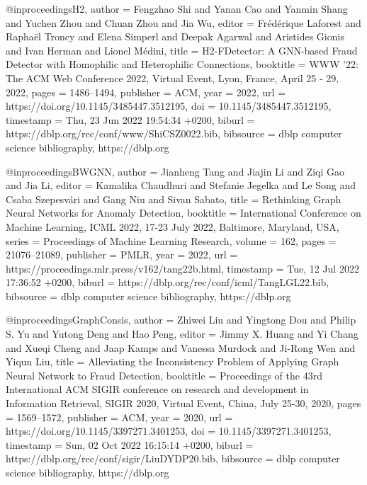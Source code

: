 @inproceedings{H2,
  author    = {Fengzhao Shi and
               Yanan Cao and
               Yanmin Shang and
               Yuchen Zhou and
               Chuan Zhou and
               Jia Wu},
  editor    = {Fr{\'{e}}d{\'{e}}rique Laforest and
               Rapha{\"{e}}l Troncy and
               Elena Simperl and
               Deepak Agarwal and
               Aristides Gionis and
               Ivan Herman and
               Lionel M{\'{e}}dini},
  title     = {H2-FDetector: {A} GNN-based Fraud Detector with Homophilic and Heterophilic
               Connections},
  booktitle = {{WWW} '22: The {ACM} Web Conference 2022, Virtual Event, Lyon, France,
               April 25 - 29, 2022},
  pages     = {1486--1494},
  publisher = {{ACM}},
  year      = {2022},
  url       = {https://doi.org/10.1145/3485447.3512195},
  doi       = {10.1145/3485447.3512195},
  timestamp = {Thu, 23 Jun 2022 19:54:34 +0200},
  biburl    = {https://dblp.org/rec/conf/www/ShiCSZ0022.bib},
  bibsource = {dblp computer science bibliography, https://dblp.org}
}

@inproceedings{BWGNN,
  author    = {Jianheng Tang and
               Jiajin Li and
               Ziqi Gao and
               Jia Li},
  editor    = {Kamalika Chaudhuri and
               Stefanie Jegelka and
               Le Song and
               Csaba Szepesv{\'{a}}ri and
               Gang Niu and
               Sivan Sabato},
  title     = {Rethinking Graph Neural Networks for Anomaly Detection},
  booktitle = {International Conference on Machine Learning, {ICML} 2022, 17-23 July
               2022, Baltimore, Maryland, {USA}},
  series    = {Proceedings of Machine Learning Research},
  volume    = {162},
  pages     = {21076--21089},
  publisher = {{PMLR}},
  year      = {2022},
  url       = {https://proceedings.mlr.press/v162/tang22b.html},
  timestamp = {Tue, 12 Jul 2022 17:36:52 +0200},
  biburl    = {https://dblp.org/rec/conf/icml/TangLGL22.bib},
  bibsource = {dblp computer science bibliography, https://dblp.org}
}

@inproceedings{GraphConsis,
  author    = {Zhiwei Liu and
               Yingtong Dou and
               Philip S. Yu and
               Yutong Deng and
               Hao Peng},
  editor    = {Jimmy X. Huang and
               Yi Chang and
               Xueqi Cheng and
               Jaap Kamps and
               Vanessa Murdock and
               Ji{-}Rong Wen and
               Yiqun Liu},
  title     = {Alleviating the Inconsistency Problem of Applying Graph Neural Network
               to Fraud Detection},
  booktitle = {Proceedings of the 43rd International {ACM} {SIGIR} conference on
               research and development in Information Retrieval, {SIGIR} 2020, Virtual
               Event, China, July 25-30, 2020},
  pages     = {1569--1572},
  publisher = {{ACM}},
  year      = {2020},
  url       = {https://doi.org/10.1145/3397271.3401253},
  doi       = {10.1145/3397271.3401253},
  timestamp = {Sun, 02 Oct 2022 16:15:14 +0200},
  biburl    = {https://dblp.org/rec/conf/sigir/LiuDYDP20.bib},
  bibsource = {dblp computer science bibliography, https://dblp.org}
}

